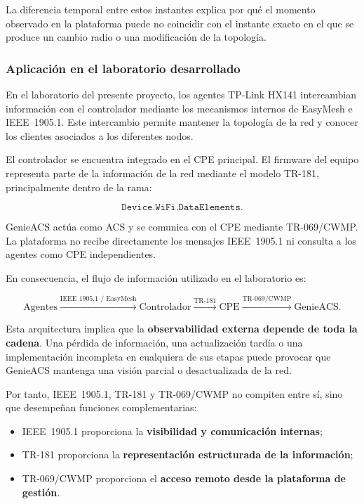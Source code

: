 La diferencia temporal entre estos instantes explica por qué el momento
observado en la plataforma puede no coincidir con el instante exacto en
el que se produce un cambio radio o una modificación de la topología.


\subsubsection*{Aplicación en el laboratorio desarrollado}

En el laboratorio del presente proyecto, los agentes TP-Link HX141
intercambian información con el controlador mediante los mecanismos
internos de EasyMesh e IEEE~1905.1. Este intercambio permite mantener la
topología de la red y conocer los clientes asociados a los diferentes
nodos.

El controlador se encuentra integrado en el CPE principal. El firmware
del equipo representa parte de la información de la red mediante el
modelo TR-181, principalmente dentro de la rama:

\[
    \texttt{Device.WiFi.DataElements.}
\]

GenieACS actúa como ACS y se comunica con el CPE mediante TR-069/CWMP. La
plataforma no recibe directamente los mensajes IEEE~1905.1 ni consulta a
los agentes como CPE independientes.

En consecuencia, el flujo de información utilizado en el laboratorio es:

\[
    \text{Agentes}
    \xrightarrow{\text{IEEE~1905.1 / EasyMesh}}
    \text{Controlador}
    \xrightarrow{\text{TR-181}}
    \text{CPE}
    \xrightarrow{\text{TR-069/CWMP}}
    \text{GenieACS}.
\]

Esta arquitectura implica que la
\textbf{observabilidad externa depende de toda la cadena}. Una pérdida de
información, una actualización tardía o una implementación incompleta en
cualquiera de sus etapas puede provocar que GenieACS mantenga una visión
parcial o desactualizada de la red.

Por tanto, IEEE~1905.1, TR-181 y TR-069/CWMP no compiten entre sí, sino
que desempeñan funciones complementarias:

\begin{itemize}
    \item IEEE~1905.1 proporciona la
    \textbf{visibilidad y comunicación internas};

    \item TR-181 proporciona la
    \textbf{representación estructurada de la información};

    \item TR-069/CWMP proporciona el
    \textbf{acceso remoto desde la plataforma de gestión}.
\end{itemize}

